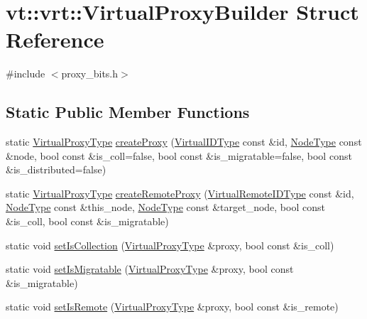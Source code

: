 \hypertarget{structvt_1_1vrt_1_1_virtual_proxy_builder}{}\section{vt\+:\+:vrt\+:\+:Virtual\+Proxy\+Builder Struct Reference}
\label{structvt_1_1vrt_1_1_virtual_proxy_builder}


{\ttfamily \#include $<$proxy\+\_\+bits.\+h$>$}

\subsection*{Static Public Member Functions}
\begin{DoxyCompactItemize}
\item 
static \hyperlink{namespacevt_a1b417dd5d684f045bb58a0ede70045ac}{Virtual\+Proxy\+Type} \hyperlink{structvt_1_1vrt_1_1_virtual_proxy_builder_ada5085518120bf7605a4fbf60863f037}{create\+Proxy} (\hyperlink{namespacevt_1_1vrt_a84d0891f52f70728c3fc2172cffb464b}{Virtual\+I\+D\+Type} const \&id, \hyperlink{namespacevt_a866da9d0efc19c0a1ce79e9e492f47e2}{Node\+Type} const \&node, bool const \&is\+\_\+coll=false, bool const \&is\+\_\+migratable=false, bool const \&is\+\_\+distributed=false)
\item 
static \hyperlink{namespacevt_a1b417dd5d684f045bb58a0ede70045ac}{Virtual\+Proxy\+Type} \hyperlink{structvt_1_1vrt_1_1_virtual_proxy_builder_a148a3a90992f5f6bbfaa41631eded0a9}{create\+Remote\+Proxy} (\hyperlink{namespacevt_1_1vrt_a8184ab8c530ce523edcdc4f4c38565be}{Virtual\+Remote\+I\+D\+Type} const \&id, \hyperlink{namespacevt_a866da9d0efc19c0a1ce79e9e492f47e2}{Node\+Type} const \&this\+\_\+node, \hyperlink{namespacevt_a866da9d0efc19c0a1ce79e9e492f47e2}{Node\+Type} const \&target\+\_\+node, bool const \&is\+\_\+coll, bool const \&is\+\_\+migratable)
\item 
static void \hyperlink{structvt_1_1vrt_1_1_virtual_proxy_builder_a352827b1e11d9e59bce97126f37426aa}{set\+Is\+Collection} (\hyperlink{namespacevt_a1b417dd5d684f045bb58a0ede70045ac}{Virtual\+Proxy\+Type} \&proxy, bool const \&is\+\_\+coll)
\item 
static void \hyperlink{structvt_1_1vrt_1_1_virtual_proxy_builder_a53b2c14444534c95b230e4403aef9ccc}{set\+Is\+Migratable} (\hyperlink{namespacevt_a1b417dd5d684f045bb58a0ede70045ac}{Virtual\+Proxy\+Type} \&proxy, bool const \&is\+\_\+migratable)
\item 
static void \hyperlink{structvt_1_1vrt_1_1_virtual_proxy_builder_ab9c411d0812ee6854f477f1efed661fb}{set\+Is\+Remote} (\hyperlink{namespacevt_a1b417dd5d684f045bb58a0ede70045ac}{Virtual\+Proxy\+Type} \&proxy, bool const \&is\+\_\+remote)

\end{DoxyCompactItemize}
